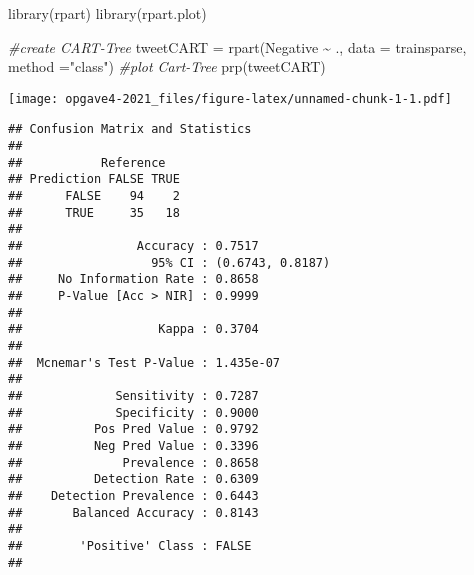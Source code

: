 \documentclass[
]{article}
\newenvironment{Shaded}{\begin{snugshade}}{\end{snugshade}}
\newcommand{\AttributeTok}[1]{\textcolor[rgb]{0.77,0.63,0.00}{#1}}
\newcommand{\CommentTok}[1]{\textcolor[rgb]{0.56,0.35,0.01}{\textit{#1}}}
\newcommand{\FunctionTok}[1]{\textcolor[rgb]{0.00,0.00,0.00}{#1}}
\newcommand{\NormalTok}[1]{#1}
\newcommand{\OtherTok}[1]{\textcolor[rgb]{0.56,0.35,0.01}{#1}}
\newcommand{\SpecialCharTok}[1]{\textcolor[rgb]{0.00,0.00,0.00}{#1}}
\newcommand{\StringTok}[1]{\textcolor[rgb]{0.31,0.60,0.02}{#1}}
\begin{document}
\begin{Shaded}
\begin{Highlighting}[]
\FunctionTok{library}\NormalTok{(rpart)}
\FunctionTok{library}\NormalTok{(rpart.plot)}

\CommentTok{\#create CART{-}Tree}
\NormalTok{tweetCART }\OtherTok{=} \FunctionTok{rpart}\NormalTok{(Negative }\SpecialCharTok{\textasciitilde{}}\NormalTok{ ., }\AttributeTok{data =}\NormalTok{ trainsparse, }\AttributeTok{method =}\StringTok{"class"}\NormalTok{)  }
\CommentTok{\#plot Cart{-}Tree}
\FunctionTok{prp}\NormalTok{(tweetCART)}
\end{Highlighting}
\end{Shaded}

\texttt{[image: opgave4-2021\_files/figure-latex/unnamed-chunk-1-1.pdf]}

\begin{Shaded}
\end{Shaded}

\begin{verbatim}
## Confusion Matrix and Statistics
## 
##           Reference
## Prediction FALSE TRUE
##      FALSE    94    2
##      TRUE     35   18
##                                           
##                Accuracy : 0.7517          
##                  95% CI : (0.6743, 0.8187)
##     No Information Rate : 0.8658          
##     P-Value [Acc > NIR] : 0.9999          
##                                           
##                   Kappa : 0.3704          
##                                           
##  Mcnemar's Test P-Value : 1.435e-07       
##                                           
##             Sensitivity : 0.7287          
##             Specificity : 0.9000          
##          Pos Pred Value : 0.9792          
##          Neg Pred Value : 0.3396          
##              Prevalence : 0.8658          
##          Detection Rate : 0.6309          
##    Detection Prevalence : 0.6443          
##       Balanced Accuracy : 0.8143          
##                                           
##        'Positive' Class : FALSE           
## 
\end{verbatim}
\end{document}

